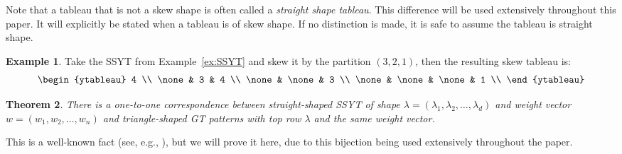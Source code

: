 \documentclass[10pt]{article}
\theoremstyle{plain}
\newtheorem{thm}{Theorem}[section]
\theoremstyle{definition}
\newtheorem{example}[thm]{Example}
\begin{document}
Note that a tableau that is not a skew shape is often called a \emph{straight shape tableau}. This difference will be used extensively throughout this paper. It will explicitly be stated when a tableau is of skew shape. If no distinction is made, it is safe to assume the tableau is straight shape. 

\begin{example}
Take the SSYT from Example~\ref{ex:SSYT} and skew it by the partition $(3,2,1)$, then the resulting skew tableau is:  
\[
\begin{ytableau}
4 \\ 
\none & 3 & 4 \\
\none & \none & 3 \\ 
\none & \none & \none & 1 \\ 
\end{ytableau}
\]
\end{example}

\begin{thm}\label{gt2ssyt}
There is a one-to-one correspondence between straight-shaped SSYT of shape $\lambda = (\lambda_1, \lambda_2, \dots, \lambda_d)$ and weight vector $w= (w_1, w_2, \dots, w_n) $ and triangle-shaped GT patterns with top row $\lambda$ and the same weight vector.
\end{thm}

This is a well-known fact (see, e.g., \cite{Stanleycombinatorics}), but we will prove it here, due to this bijection being used extensively throughout the paper. 
\end{document}
